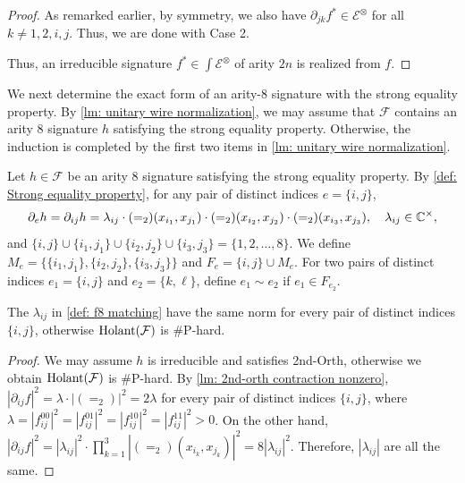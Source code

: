 \begin{proof}
    
As remarked earlier,  by symmetry, we also have ${\partial}_{jk}{f^{\ast}}\in {\mathcal{E}}^{\otimes}$ for all $k\neq 1, 2, i, j$. Thus, we are done with Case 2.

Thus, an irreducible signature ${f^\ast}\in \int\mathcal{E}^{\otimes}$ of arity $2n$ is realized from $ f$.
\end{proof}

We next determine the exact form of an arity-$8$ signature with the strong equality property. 
By \cref{lm: unitary wire normalization}, we may assume that $\mathcal{F}$ contains an arity $8$ signature $h$ satisfying the strong equality property.
Otherwise, the induction is completed by the first two items in \cref{lm: unitary wire normalization}.

\begin{definition}\label{def: f8 matching}
    Let $h\in \mathcal{F}$ be an arity 8 signature satisfying the strong equality property.
    By \cref{def: Strong equality property}, for any pair of distinct indices $e=\{i,j\}$, $$\partial_{e}h=\partial_{ij}h=\lambda_{ij}\cdot (=_2)(x_{i_1},x_{j_1})\cdot(=_2)(x_{i_2},x_{j_2})\cdot (=_2)(x_{i_3},x_{j_3}), \quad \lambda_{ij}\in \mathbb{C}^\times,$$
    and $\{i,j\}\cup \{i_1,j_1\}\cup\{i_2,j_2\}\cup\{i_3,j_3\}=\{1,2,\ldots, 8\}.$
    We define $M_e=\{\{i_1,j_1\},\{i_2,j_2\},\{i_3,j_3\}\}$ and $F_e=\{i,j\}\cup M_e.$
    For two pairs of distinct indices $e_1=\{i,j\}$ and $e_2=\{k,\ell\}$, define $e_1\sim e_2$ if $e_1\in F_{e_2}$.
\end{definition}

\begin{lemma}\label{lm: f8 matching same norm}
    The $\lambda_{ij}$ in \cref{def: f8 matching} have the same norm for every pair of distinct indices $\{i,j\}$, otherwise $\operatorname{Holant}(\mathcal{F})$ is \#P-hard.
\end{lemma}
\begin{proof}
    We may assume $h$ is irreducible and satisfies {\sc 2nd-Orth}, otherwise we obtain $\operatorname{Holant}(\mathcal{F})$ is \#P-hard.
    By \cref{lm: 2nd-orth contraction nonzero}, $|\partial_{ij}f|^2=\lambda\cdot |(=_2)|^2=2\lambda$ for every pair of distinct indices $\{i,j\}$, where $\lambda=|f_{ij}^{00}|^2=|f_{ij}^{01}|^2=|f_{ij}^{10}|^2=|f_{ij}^{11}|^2>0$.
    On the other hand, $|\partial_{ij}f|^2=|\lambda_{ij}|^2\cdot \prod_{k=1}^3|(=_2)(x_{i_k},x_{j_k})|^2=8|\lambda_{ij}|^2.$
    Therefore, $|\lambda_{ij}|$ are all the same.
\end{proof}


